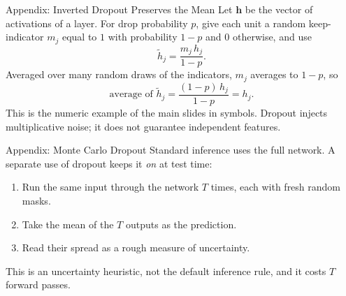 \documentclass{ntuabeamer}
\begin{document}
\begin{frame}{Appendix: Inverted Dropout Preserves the Mean}
  Let $\mathbf h$ be the vector of activations of a layer. For drop probability $p$, give each unit a random
  keep-indicator $m_j$ equal to $1$ with probability $1-p$ and $0$ otherwise, and use
  \[
    \widetilde h_j=\frac{m_j\,h_j}{1-p}.
  \]
  Averaged over many random draws of the indicators, $m_j$ averages to $1-p$, so
  \[
    \text{average of }\widetilde h_j=\frac{(1-p)\,h_j}{1-p}=h_j .
  \]
  This is the numeric example of the main slides in symbols. Dropout injects multiplicative noise; it does not guarantee independent features.
\end{frame}

\begin{frame}{Appendix: Monte Carlo Dropout}
  Standard inference uses the full network. A separate use of dropout keeps it \emph{on} at test time:
  \begin{enumerate}
    \item Run the same input through the network $T$ times, each with fresh random masks.
    \item Take the mean of the $T$ outputs as the prediction.
    \item Read their spread as a rough measure of uncertainty.
  \end{enumerate}
  This is an uncertainty heuristic, not the default inference rule, and it costs $T$ forward passes.
\end{frame}
\end{document}
